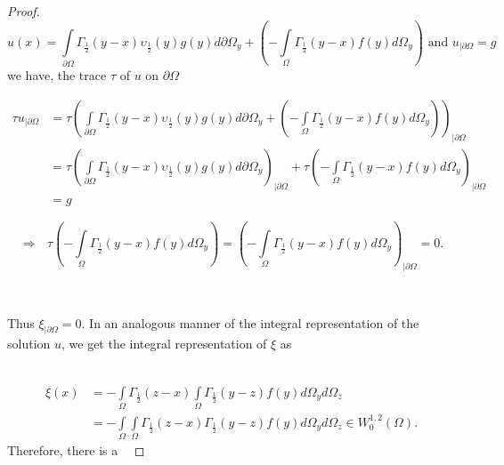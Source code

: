 \documentclass[10pt,a4paper]{amsart}
\numberwithin{equation}{section}
\begin{document}
\begin{proof}
\[
u\left(  x\right)  =%
{\displaystyle\int\limits_{\partial\Omega}}
\Gamma_{\frac{1}{2}}\left(  y-x\right)  \upsilon_{\frac{1}{2}}\left(
y\right)  g(y)d\partial\Omega_{y}+\left(  -%
{\displaystyle\int\limits_{\Omega}}
\Gamma_{\frac{1}{2}}\left(  y-x\right)  f(y)d\Omega_{y}\right)  \text{ \ and
\ }u_{\mid\partial\Omega}=g
\]
we have, the trace $\tau$ of $u$ on $\partial\Omega$%

\begin{align*}
\tau u_{\mid\partial\Omega}  & =\tau\left(
{\displaystyle\int\limits_{\partial\Omega}}
\Gamma_{\frac{1}{2}}\left(  y-x\right)  \upsilon_{\frac{1}{2}}\left(
y\right)  g(y)d\partial\Omega_{y}+\left(  -%
{\displaystyle\int\limits_{\Omega}}
\Gamma_{\frac{1}{2}}\left(  y-x\right)  f(y)d\Omega_{y}\right)  \right)
_{\mid\partial\Omega}\\
& =\tau\left(
{\displaystyle\int\limits_{\partial\Omega}}
\Gamma_{\frac{1}{2}}\left(  y-x\right)  \upsilon_{\frac{1}{2}}\left(
y\right)  g(y)d\partial\Omega_{y}\right)  _{\mid\partial\Omega}+\tau\left(  -%
{\displaystyle\int\limits_{\Omega}}
\Gamma_{\frac{1}{2}}\left(  y-x\right)  f(y)d\Omega_{y}\right)  _{\mid
\partial\Omega}\\
& =g
\end{align*}
%

\[
\Longrightarrow\text{ \ \ \ \ }\tau\left(  -%
{\displaystyle\int\limits_{\Omega}}
\Gamma_{\frac{1}{2}}\left(  y-x\right)  f(y)d\Omega_{y}\right)  =\left(  -%
{\displaystyle\int\limits_{\Omega}}
\Gamma_{\frac{1}{2}}\left(  y-x\right)  f(y)d\Omega_{y}\right)  _{\mid
\partial\Omega}=0\text{.}%
\]


\ \ 

Thus $\xi_{\mid\partial\Omega}=0$. In an analogous manner of the integral
representation of the solution $u$, we get the integral representation of
$\xi$ as

\
\begin{align*}
\xi\left(  x\right)   & =-%
{\displaystyle\int\limits_{\Omega}}
\Gamma_{\frac{1}{2}}\left(  z-x\right)
{\displaystyle\int\limits_{\Omega}}
\Gamma_{\frac{1}{2}}\left(  y-z\right)  f(y)d\Omega_{y}d\Omega_{z}\\
& =-%
{\displaystyle\int\limits_{\Omega}}
{\displaystyle\int\limits_{\Omega}}
\Gamma_{\frac{1}{2}}\left(  z-x\right)  \Gamma_{\frac{1}{2}}\left(
y-z\right)  f(y)d\Omega_{y}d\Omega_{z}\in W_{0}^{1,2}\left(  \Omega\right)
\text{.}%
\end{align*}
Therefore, there is a \ %


\end{proof}
\end{document}
